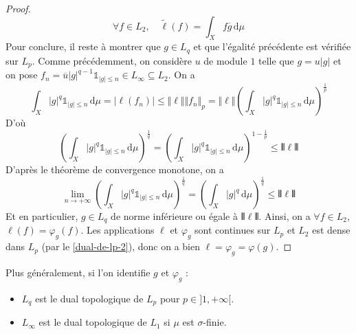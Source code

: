 \begin{proof}
    \[ \forall f \in L_2, \quad \widetilde{\ell}(f) = \int_X f \overline{g} \, \mathrm{d}\mu \]
    Pour conclure, il reste à montrer que $g \in L_q$ et que l'égalité précédente est vérifiée sur $L_p$. Comme précédemment, on considère $u$ de module $1$ telle que $g = u \vert g \vert$ et on pose $f_n = \overline{u} \vert g \vert^{q-1} \mathbb{1}_{\vert g \vert \leq n} \in L_\infty \subseteq L_2$. On a
    \[ \int_X \vert g \vert^q \mathbb{1}_{\vert g \vert \leq n} \, \mathrm{d}\mu = \vert \ell(f_n) \vert \leq \Vert \ell \Vert \Vert f_n \Vert_p = \Vert \ell \Vert \left ( \int_X \vert g \vert^q \mathbb{1}_{\vert g \vert \leq n} \, \mathrm{d}\mu \right )^{\frac{1}{p}} \]
    D'où
    \[ \left ( \int_X \vert g \vert^q \mathbb{1}_{\vert g \vert \leq n} \, \mathrm{d}\mu \right )^{\frac{1}{q}} = \left ( \int_X \vert g \vert^q \mathbb{1}_{\vert g \vert \leq n} \, \mathrm{d}\mu \right )^{1 - \frac{1}{p}} \leq \VERT \ell \VERT \]
    D'après le théorème de convergence monotone, on a
    \[ \lim_{n \rightarrow +\infty} \left ( \int_X \vert g \vert^q \mathbb{1}_{\vert g \vert \leq n} \, \mathrm{d}\mu \right )^{\frac{1}{q}} = \left ( \int_X \vert g \vert^q \, \mathrm{d}\mu \right )^{\frac{1}{q}} \leq \VERT \ell \VERT \]
    Et en particulier, $g \in L_q$ de norme inférieure ou égale à $\VERT \ell \VERT$. Ainsi, on a $\forall f \in L_2$, $\ell(f) = \varphi_g(f)$. Les applications $\ell$ et $\varphi_g$ sont continues sur $L_p$ et $L_2$ est dense dans $L_p$ (par le \cref{dual-de-lp-2}), donc on a bien $\ell = \varphi_g = \varphi(g)$.
  \end{proof}


  \begin{remark}
    Plus généralement, si l'on identifie $g$ et $\varphi_g$ :
    \begin{itemize}
      \item $L_q$ est le dual topologique de $L_p$ pour $p \in ]1, +\infty[$.
      \item $L_\infty$ est le dual topologique de $L_1$ si $\mu$ est $\sigma$-finie.
    \end{itemize}
  \end{remark}

